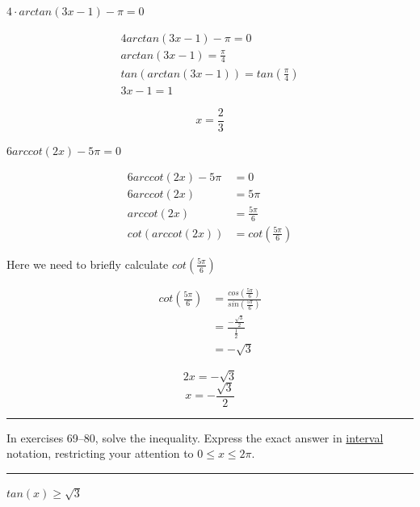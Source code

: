 \documentclass[10pt,letterpaper]{amspset}
\begin{document}
\begin{problem}[61]
    $4 \cdot arctan(3x - 1) - \pi = 0$
\end{problem}

\begin{solution}
    \begin{align}
        4 arctan(3x - 1) - \pi = 0 \\ 
        arctan(3x - 1) = \frac{\pi}{4} \\
        tan(arctan(3x - 1)) = tan(\frac{\pi}{4}) \\
        3x - 1 = 1
    \end{align}
    
    \[\boxed{x = \frac{2}{3}}\]
\end{solution}


\pagebreak


\begin{problem}[62]
    $6arccot(2x) - 5\pi = 0$
\end{problem}

\begin{solution}
    \begin{align}
        6arccot(2x) - 5\pi &= 0 \\
        6arccot(2x) &= 5\pi \\
        arccot(2x) &= \frac{5\pi}{6} \\
        cot(arccot(2x)) &= cot(\frac{5\pi}{6})
    \end{align}
    
    Here we need to briefly calculate $cot \left( \frac{5\pi}{6} \right)$
    
    \begin{align}
        cot \left( \frac{5\pi}{6} \right) &= \frac{cos \left( \frac{5\pi}{6} \right)}{sin \left( \frac{5\pi}{6} \right)} \\
        &= \frac{  -\frac{\sqrt{3}}{2}  } { \frac{1}{2}  } \\
        &= -\sqrt{3}
    \end{align}
    
    \[2x = -\sqrt{3}\]
    \[\boxed{  x = -\frac{\sqrt{3}}{2}  }\]
    \end{solution}
    

\pagebreak

    
\hrule \medskip
In exercises 69--80, solve the inequality. Express the exact answer in \underline{interval} notation, restricting your attention to $0 \leq x \leq 2\pi$. \medskip
\hrule
\begin{problem}[70]
    $tan(x) \geq \sqrt{3}$
\end{problem}
\end{document}
